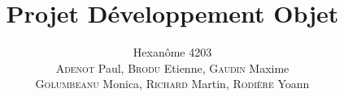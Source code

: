 


\title{\textbf{Projet Développement Objet}}
\author{Hexanôme 4203\\
\textsc{Adenot} Paul, \textsc{Brodu} Etienne, \textsc{Gaudin} Maxime\\
\textsc{Golumbeanu} Monica, \textsc{Richard} Martin, \textsc{Rodière} Yoann}

\graphicspath{{./img/}{../img/}{../../img/}{../../../img/}}


	\maketitle
	\tableofcontents

	\newpage
	
	

	\newpage
	
	

	\newpage
	
	

	\newpage
	
	

	\newpage
	

	\newpage
	

	\newpage
	

